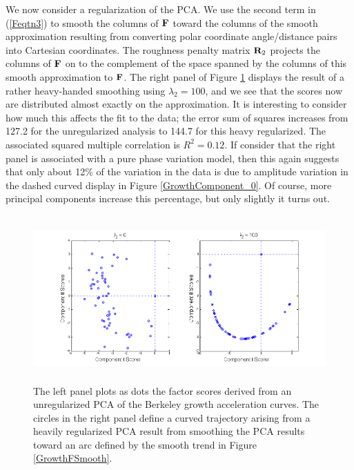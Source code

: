 \documentclass[12pt]{article}
\begin{document}
We now consider a regularization of the PCA.  We use the second term in (\ref{Feqtn3}) to smooth the columns of $\mbox{\bf F}$ toward the columns of the smooth approximation resulting from converting polar coordinate angle/distance pairs into Cartesian coordinates.  The roughness penalty matrix $\mbox{\bf R}_2$ projects the columns of $\mbox{\bf F}$ on to the complement of the space spanned by the columns of this smooth approximation to $\mbox{\bf F}$.  The right panel of Figure \ref{GrowthScores} displays the result of a rather heavy-handed smoothing using $\lambda_2 = 100$, and we see that the scores now are distributed almost exactly on the approximation.  It is interesting to consider how much this affects the fit to the data;  the error sum of squares increases from 127.2 for the unregularized analysis to 144.7 for this heavy regularized.  The associated squared multiple correlation is $R^2 = 0.12$.  If consider that the right panel is associated with a pure phase variation model, then this again suggests that only about 12\% of the variation in the data is due to amplitude variation in the dashed curved display in Figure \ref{GrowthComponent_0}.  Of course, more principal components increase this percentage, but only slightly it turns out.

\begin{figure}
  \includegraphics[height=2.5in, width=6in]{figs/GrowthScores}
  \caption{The left panel plots as dots the factor scores derived from an unregularized PCA of the Berkeley growth acceleration curves.  The circles in the right panel define a curved trajectory arising from a heavily regularized PCA result from smoothing the PCA results toward an arc defined by the smooth trend in Figure \ref{GrowthFSmooth}.}
  \label{GrowthScores}
\end{figure}
\end{document}
